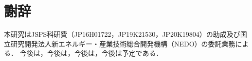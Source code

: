 \documentclass{fit}
\theoremstyle{definition}
\begin{document}
\section*{謝辞}

本研究はJSPS科研費（JP16H01722，JP19K21530，JP20K19804）の助成及び国立研究開発法人新エネルギー・産業技術総合開発機構（NEDO）の委託業務による．
今後は，今後は，今後は，今後は予定である．
\small


\end{document}
